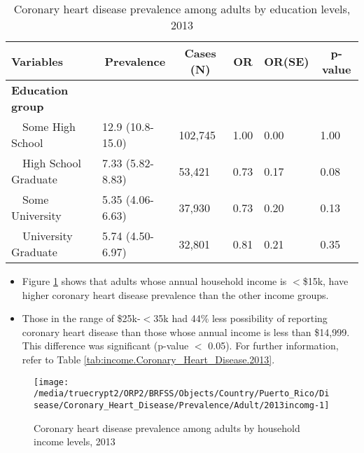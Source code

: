 \begin{table}[H]
\caption{Coronary heart disease prevalence  among adults by education levels, 2013\label{tab:edu.Coronary_Heart_Disease.2013}} 
\begin{center}
\begin{tabular}{llllll}
\hline\hline
\multicolumn{1}{l}{Variables}&\multicolumn{1}{c}{Prevalence}&\multicolumn{1}{c}{Cases (N)}&\multicolumn{1}{c}{OR}&\multicolumn{1}{c}{OR(SE)}&\multicolumn{1}{c}{p-value}\tabularnewline
\hline
{\bfseries Education group}&&&&&\tabularnewline
~~Some High School&12.9 (10.8-15.0)&102,745&1.00&0.00&1.00\tabularnewline
~~High School Graduate&7.33 (5.82-8.83)& 53,421&0.73&0.17&0.08\tabularnewline
~~Some University&5.35 (4.06-6.63)& 37,930&0.73&0.20&0.13\tabularnewline
~~University Graduate&5.74 (4.50-6.97)& 32,801&0.81&0.21&0.35\tabularnewline
\hline
\end{tabular}\end{center}

\end{table}

 
 
 \newpage
\begin{itemize}

\item Figure \ref{fig:income.Coronary_Heart_Disease.2013} shows that adults whose annual household income is 
$<$\$15k, have higher coronary heart disease prevalence than the other income groups.

\item Those in the range of \$25k-$<$35k had 44\% less possibility of reporting coronary heart disease than those whose annual income is less than \$14,999. This difference was significant (p-value $<$ 0.05).  For further information, refer to Table \ref{tab:income.Coronary_Heart_Disease.2013}.

\end{itemize}

\begin{figure}[H]
\caption{Coronary heart disease prevalence among adults by household income levels, 
         2013}
\begin{knitrout}
\color{fgcolor}

{\centering \texttt{[image: /media/truecrypt2/ORP2/BRFSS/Objects/Country/Puerto\_Rico/Disease/Coronary\_Heart\_Disease/Prevalence/Adult/2013incomg-1]} 

}



\end{knitrout}
 \label{fig:income.Coronary_Heart_Disease.2013}
\end{figure}

